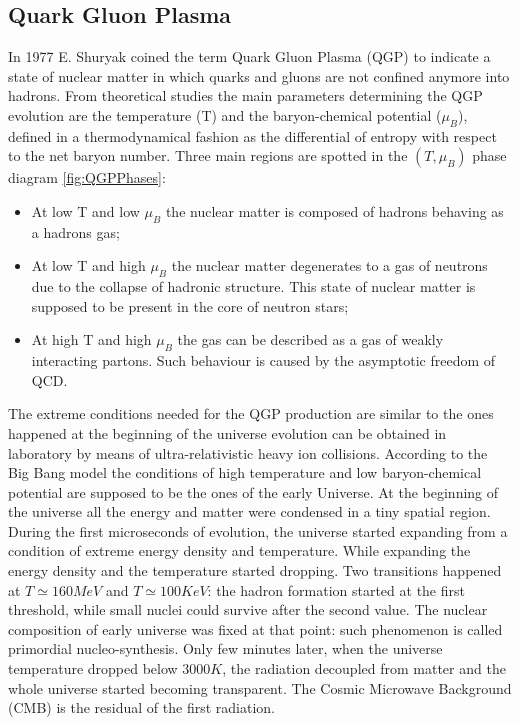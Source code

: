 \subsection{Quark Gluon Plasma}
In 1977 E. Shuryak coined the term Quark Gluon Plasma (QGP) to indicate a state of nuclear matter in which quarks and gluons are not confined anymore into hadrons.
From theoretical studies the main parameters determining the QGP evolution are the temperature (T) and the baryon-chemical potential ($\mu_B$), defined in a thermodynamical fashion as the differential of entropy with respect to the net baryon number.
Three main regions are spotted in the $(T,\mu_B)$ phase diagram \ref{fig:QGPPhases}:
\begin{itemize}
    \item At low T and low $\mu_B$ the nuclear matter is composed of hadrons behaving as a hadrons gas;
    \item At low T and high $\mu_B$ the nuclear matter degenerates to a gas of neutrons due to the collapse of hadronic structure. This state of nuclear matter is supposed to be present in the core of neutron stars;
    \item At high T and high $\mu_B$ the gas can be described as a gas of weakly interacting partons. Such behaviour is caused by the asymptotic freedom of QCD.
\end{itemize}
The extreme conditions needed for the QGP production are similar to the ones happened at the beginning of the universe evolution can be obtained in laboratory by means of ultra-relativistic heavy ion collisions.
According to the Big Bang model the conditions of high temperature and low baryon-chemical potential are supposed to be the ones of the early Universe.
At the beginning of the universe all the energy and matter were condensed in a tiny spatial region.
During the first microseconds of evolution, the universe started expanding from a condition of extreme energy density and temperature.
While expanding the energy density and the temperature started dropping.
Two transitions happened at $T\simeq160 MeV$ and $T\simeq100 KeV$: the hadron formation started at the first threshold, while small nuclei could survive after the second value.
The nuclear composition of early universe was fixed at that point: such phenomenon is called primordial nucleo-synthesis.
Only few minutes later, when the universe temperature dropped below $3000K$, the radiation decoupled from matter and the whole universe started becoming transparent.
The Cosmic Microwave Background (CMB) is the residual of the first radiation.

